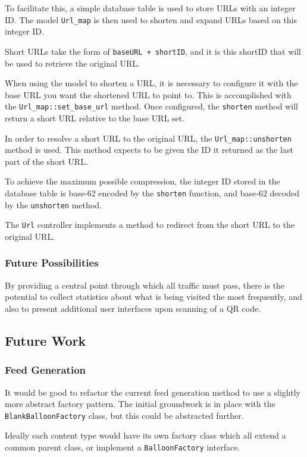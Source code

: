 To facilitate this, a simple database table is used to store URLs with an integer ID. The model \texttt{Url\_map} is then used to shorten and expand URLs based on this integer ID.

Short URLs take the form of \texttt{baseURL + shortID}, and it is this shortID that will be used to retrieve the original URL.

When using the model to shorten a URL, it is necessary to configure it with the base URL you want the shortened URL to point to. This is accomplished with the \texttt{Url\_map::set\_base\_url} method. Once configured, the \texttt{shorten} method will return a short URL relative to the base URL set.

In order to resolve a short URL to the original URL, the \texttt{Url\_map::unshorten} method is used. This method expects to be given the ID it returned as the last part of the short URL.

To achieve the maximum possible compression, the integer ID stored in the database table is base-62 encoded by the \texttt{shorten} function, and base-62 decoded by the \texttt{unshorten} method.

The \texttt{Url} controller implements a method to redirect from the short URL to the original URL.

\subsubsection{Future Possibilities}
By providing a central point through which all traffic must pass, there is the potential to collect statistics about what is being visited the most frequently, and also to present additional user interfaces upon scanning of a QR code.

\subsection{Future Work}

\subsubsection{Feed Generation}
It would be good to refactor the current feed generation method to use a slightly more abstract factory pattern. The initial groundwork is in place with the \texttt{BlankBalloonFactory} class, but this could be abstracted further.

Ideally each content type would have its own factory class which all extend a common parent class, or implement a \texttt{BalloonFactory} interface.

